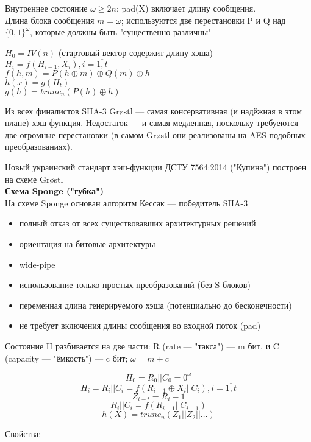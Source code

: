 Внутреннее состояние $\omega \geq 2n$; pad(X) включает длину сообщения.\\
Длина блока сообщения $m = \omega$; используются две перестановки P и Q над $\{0, 1\}^\omega$, которые должны быть "существенно различны"

$H_0 = IV(n)$ (стартовый вектор содержит длину хэша)\\
$H_i = f(H_{i - 1}, X_i), i = \overline{1, t}$\\
$f(h, m) = P(h \oplus m) \oplus Q(m) \oplus h$\\
$h(x) = g(H_t)$\\
$g(h) = trunc_n(P(h) \oplus h)$

Из всех финалистов SHA-3 Gr{\o}stl --- самая консервативная (и надёжная в этом плане)
хэш-функция. Недостаток --- и самая медленная, поскольку требуеются две огромные
перестановки (в самом Gr{\o}stl они реализованы на AES-подобных преобразованиях).

Новый украинский стандарт хэш-функции ДСТУ 7564:2014 ("Купина") построен на схеме Gr{\o}stl\\[0.4cm]

{\large{\bfseries Схема Sponge ("губка")}}\\[0.2cm]

На схеме Sponge основан алгоритм Кессак --- победитель SHA-3
\begin{itemize}
  \item полный отказ от всех существовавших архитектурных решений
  \item ориентация на битовые архитектуры
  \item wide-pipe
  \item использование только простых преобразований (без S-блоков)
  \item переменная длина генерируемого хэша (потенциально до бесконечности)
  \item не требует включения длины сообщения во входной поток (pad)
\end{itemize}

Состояние H разбивается на две части: R (rate --- "такса") --- m бит, и C (capacity --- "ёмкость") --- c бит; $\omega = m + c$

\[H_0 = R_0 || C_0 = 0^\omega\]
\[H_i = R_i || C_i = f(R_{i-1} \oplus X_i || C_i), i = \overline{1, t}\]
\[Z_{i - t} = R_i - 1\]
\[R_i || C_i = f(R_{i - 1} || C_{i - 1})\]
\[h(X) = trunc_n(Z_1 || Z_2 || \ldots )\]

Свойства:


